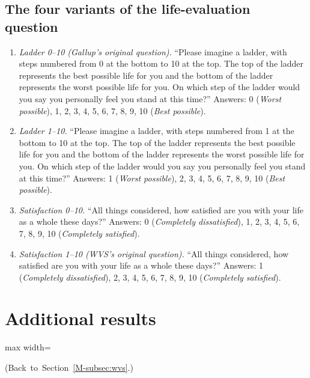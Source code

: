\documentclass[12pt]{article}
\begin{document}
\subsection{The four variants of the life-evaluation question}

\begin{enumerate}
    \item \textit{Ladder 0--10 (Gallup's original question).} ``Please imagine a ladder, with steps numbered from 0 at the bottom to 10 at the top. The top of the ladder represents the best possible life for you and the bottom of the ladder represents the worst possible life for you. On which step of the ladder would you say you personally feel you stand at this time?'' Answers: 0 (\textit{Worst possible}), 1, 2, 3, 4, 5, 6, 7, 8, 9, 10 (\textit{Best possible}).
    \item \textit{Ladder 1--10.} ``Please imagine a ladder, with steps numbered from 1 at the bottom to 10 at the top. The top of the ladder represents the best possible life for you and the bottom of the ladder represents the worst possible life for you. On which step of the ladder would you say you personally feel you stand at this time?'' Answers: 1 (\textit{Worst possible}), 2, 3, 4, 5, 6, 7, 8, 9, 10 (\textit{Best possible}).
    \item \textit{Satisfaction 0--10.} ``All things considered, how satisfied are you with your life as a whole these days?'' Answers: 0 (\textit{Completely dissatisfied}), 1, 2, 3, 4, 5, 6, 7, 8, 9, 10 (\textit{Completely satisfied}).
    \item \textit{Satisfaction 1--10 (WVS's original question).} ``All things considered, how satisfied are you with your life as a whole these days?'' Answers: 1 (\textit{Completely dissatisfied}), 2, 3, 4, 5, 6, 7, 8, 9, 10 (\textit{Completely satisfied}).
\end{enumerate}

\section{Additional results}\label{app:additional}

\begin{table}[htbp]
    \centering
    \begin{adjustbox}{max width=\textwidth}
    
    \end{adjustbox}
    \caption{Correlation between national well-being indicators (WVS country-years).}\label{tab:correlation}
    \begin{minipage}{\textwidth}\footnotesize \hfill(Back~to~Section~\ref{M-subsec:wvs}.)\end{minipage}
\end{table}
\end{document}
